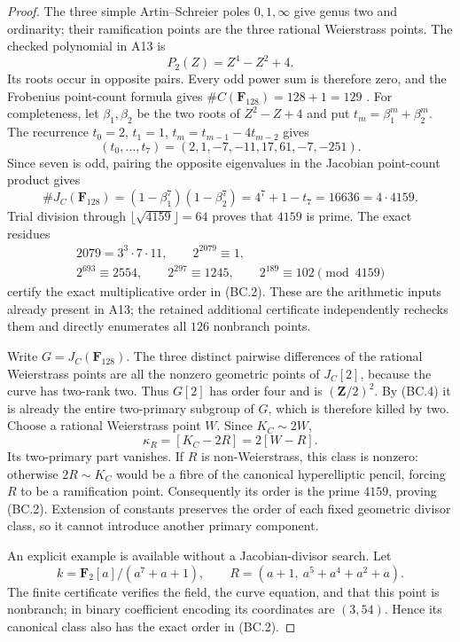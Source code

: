 \documentclass[11pt,a4paper]{article}
\begin{document}
\begin{proof}
The three simple Artin--Schreier poles $0,1,\infty$ give
genus two and ordinarity; their ramification points are the
three rational Weierstrass points. The checked polynomial
in A13 is
\[
                         P_2(Z)=Z^4-Z^2+4.
 \tag{BC.3}
\]
Its roots occur in opposite pairs. Every odd power sum is
therefore zero, and the Frobenius point-count formula gives
$\#C(\mathbf F_{128})=128+1=129$
\cite[Theorem~11.1]{MilneJV}.
For completeness, let $\beta_1,\beta_2$ be the two roots of
$Z^2-Z+4$ and put $t_m=\beta_1^m+\beta_2^m$.
The recurrence $t_0=2$, $t_1=1$, $t_m=t_{m-1}-4t_{m-2}$
gives
\[
               (t_0,\ldots,t_7)=(2,1,-7,-11,17,61,-7,-251).
\]
Since seven is odd, pairing the opposite eigenvalues in
the Jacobian point-count product
\cite[Theorem~19.1(b)]{MilneAV} gives
\[
 \#J_C(\mathbf F_{128})
    =(1-\beta_1^7)(1-\beta_2^7)
    =4^7+1-t_7=16636=4\cdot4159.
 \tag{BC.4}
\]
Trial division through $\lfloor\sqrt{4159}\rfloor=64$
proves that $4159$ is prime. The exact residues
\[
 \begin{gathered}
 2079=3^3\cdot7\cdot11,\qquad
 2^{2079}\equiv1,\\
 2^{693}\equiv2554,\qquad
 2^{297}\equiv1245,\qquad
 2^{189}\equiv102\pmod{4159}
 \end{gathered}
 \tag{BC.5}
\]
certify the exact multiplicative order in (BC.2).
These are the arithmetic inputs already present in A13;
the retained additional certificate independently rechecks
them and directly enumerates all $126$ nonbranch points.

Write $G=J_C(\mathbf F_{128})$. The three distinct pairwise
differences of the rational Weierstrass points are all the
nonzero geometric points of $J_C[2]$, because the curve has
two-rank two. Thus $G[2]$ has order four and is
$(\mathbf Z/2)^2$. By (BC.4) it is already the entire
two-primary subgroup of $G$, which is therefore killed by two.
Choose a rational Weierstrass point $W$. Since $K_C\sim2W$,
\[
                         \kappa_R=[K_C-2R]=2[W-R].
 \tag{BC.6}
\]
Its two-primary part vanishes. If $R$ is non-Weierstrass,
this class is nonzero: otherwise $2R\sim K_C$ would be a
fibre of the canonical hyperelliptic pencil, forcing $R$ to
be a ramification point. Consequently its order is the
prime $4159$, proving (BC.2). Extension of constants preserves
the order of each fixed geometric divisor class, so it cannot
introduce another primary component.

An explicit example is available without a Jacobian-divisor
search. Let
\[
 k=\mathbf F_2[a]/(a^7+a+1),\qquad
 R=(a+1,\ a^5+a^4+a^2+a).
 \tag{BC.7}
\]
The finite certificate verifies the field, the curve equation,
and that this point is nonbranch; in binary coefficient
encoding its coordinates are $(3,54)$. Hence its canonical
class also has the exact order in (BC.2).
\end{proof}
\end{document}
